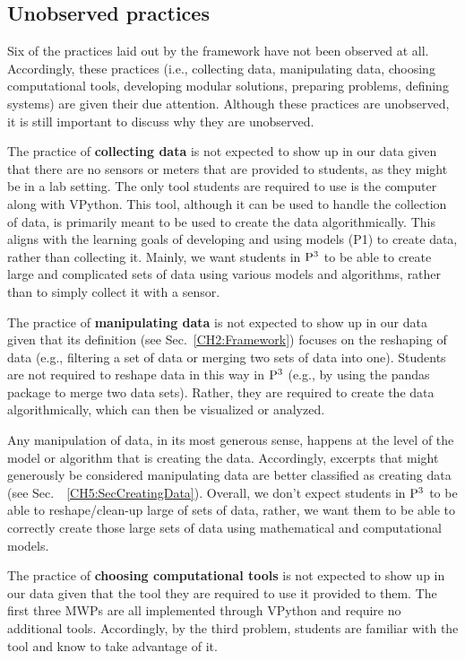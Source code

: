 \documentclass{msuphddissertation}
\begin{document}
\begin{doublespace}
%
%
%
%
%
%
%
%
%
%
%
%
%
%
%
%

\subsection{Unobserved practices}

Six of the practices laid out by the framework have not been observed at all.  Accordingly, these practices (i.e., collecting data, manipulating data, choosing computational tools, developing modular solutions, preparing problems, defining systems) are given their due attention.  Although these practices are unobserved, it is still important to discuss why they are unobserved.

The practice of \textbf{collecting data} is not expected to show up in our data given that there are no sensors or meters that are provided to students, as they might be in a lab setting.  The only tool students are required to use is the computer along with VPython.  This tool, although it can be used to handle the collection of data, is primarily meant to be used to create the data algorithmically.  This aligns with the learning goals of developing and using models (P1) to create data, rather than collecting it.  Mainly, we want students in ${\rm P}^{3}$ to be able to create large and complicated sets of data using various models and algorithms, rather than to simply collect it with a sensor.

The practice of \textbf{manipulating data} is not expected to show up in our data given that its definition (see Sec.~\ref{CH2:Framework}) focuses on the reshaping of data (e.g., filtering a set of data or merging two sets of data into one).  Students are not required to reshape data in this way in ${\rm P}^{3}$ (e.g., by using the pandas package to merge two data sets).  Rather, they are required to create the data algorithmically, which can then be visualized or analyzed.

Any manipulation of data, in its most generous sense, happens at the level of the model or algorithm that is creating the data.  Accordingly, excerpts that might generously be considered manipulating data are better classified as creating data (see Sec.~~\ref{CH5:SecCreatingData}).  Overall, we don't expect students in ${\rm P}^{3}$ to be able to reshape/clean-up large of sets of data, rather, we want them to be able to correctly create those large sets of data using mathematical and computational models.

The practice of \textbf{choosing computational tools} is not expected to show up in our data given that the tool they are required to use it provided to them.  The first three MWPs are all implemented through VPython and require no additional tools.  Accordingly, by the third problem, students are familiar with the tool and know to take advantage of it.


\end{doublespace}
\end{document}
